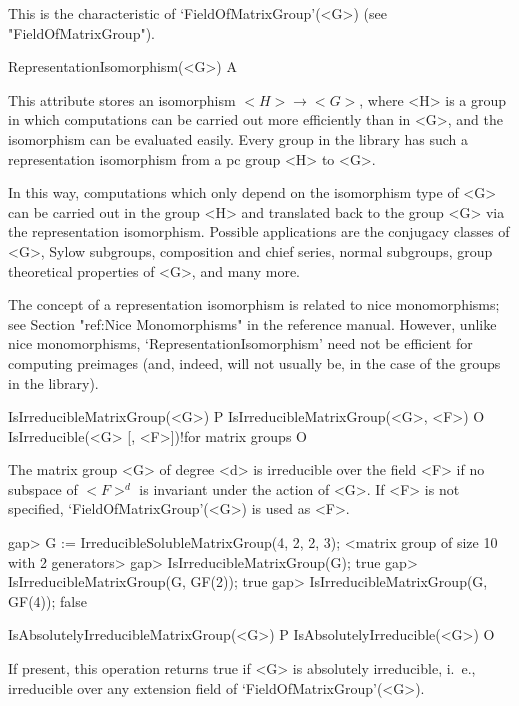 This is the characteristic of `FieldOfMatrixGroup'(<G>) (see "FieldOfMatrixGroup").


\>RepresentationIsomorphism(<G>) A

This attribute stores an isomorphism $<H> \to <G>$, where <H> is a group
in which computations can be carried out more efficiently than in <G>, and 
the isomorphism can be evaluated easily. Every group in the {\IRREDSOL} library
has such a representation isomorphism from a pc group <H> to <G>.

In this way, computations which only depend on the 
isomorphism type of <G> can be carried out in the group <H> and translated
back to the group <G> via the representation isomorphism. Possible applications are the conjugacy classes of <G>, Sylow subgroups, composition and chief series, normal subgroups, group theoretical properties of <G>, and many more. 

The concept of a representation isomorphism is related to 
nice monomorphisms; see Section "ref:Nice Monomorphisms" in the {\GAP} 
reference manual. However, unlike nice monomorphisms, 
`RepresentationIsomorphism' need not be efficient for computing preimages (and, indeed, will not usually be, in the case of the groups in the {\IRREDSOL} library). 


\null


\>IsIrreducibleMatrixGroup(<G>) P
\>IsIrreducibleMatrixGroup(<G>, <F>) O
\>IsIrreducible(<G> [, <F>])!{for matrix groups} O

The matrix group <G> of degree <d> is irreducible over the field <F> if no subspace of $<F>^d$ is
invariant under the action of <G>. If <F> is not
specified, `FieldOfMatrixGroup'(<G>) is used as <F>.

\beginexample
gap> G := IrreducibleSolubleMatrixGroup(4, 2, 2, 3);
<matrix group of size 10 with 2 generators>
gap> IsIrreducibleMatrixGroup(G);
true
gap> IsIrreducibleMatrixGroup(G, GF(2));
true
gap> IsIrreducibleMatrixGroup(G, GF(4));
false
\endexample

\>IsAbsolutelyIrreducibleMatrixGroup(<G>) P
\>IsAbsolutelyIrreducible(<G>) O

If present, this operation returns true if <G> is absolutely irreducible, i.~e., irreducible over any
extension field of `FieldOfMatrixGroup'(<G>).

